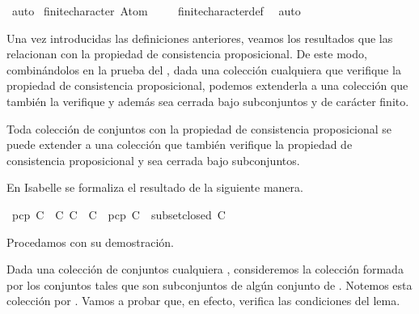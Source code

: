 \begin{isabellebody}
\ auto%
\endisatagproof
{\isafoldproof}%
%
\isadelimproof
\isanewline
%
\endisadelimproof
\isanewline
{}\isamarkupfalse%
\ {\isachardoublequoteopen}finite{\isacharunderscore}character\ {\isacharbraceleft}{\isacharbraceleft}Atom\ {}{\isacharbraceright}{\isacharcomma}{\isacharbraceleft}{\isacharbraceright}{\isacharbraceright}{\isachardoublequoteclose}\isanewline
%
\isadelimproof
\ \ %
\endisadelimproof
%
\isatagproof
{}\isamarkupfalse%
\ finite{\isacharunderscore}character{\isacharunderscore}def\ \isamarkupfalse%
\ auto%
\endisatagproof
{\isafoldproof}%
%
\isadelimproof
%
\endisadelimproof
%
\begin{isamarkuptext}%
Una vez introducidas las definiciones anteriores, veamos los resultados que las relacionan
  con la propiedad de consistencia proposicional. De este modo, combinándolos en la prueba del 
  , dada una colección  cualquiera que verifique la propiedad 
  de consistencia proposicional, podemos extenderla a una colección  que también la verifique y 
  además sea cerrada bajo subconjuntos y de carácter finito.


  \begin{lema}
    Toda colección de conjuntos con la propiedad de consistencia proposicional se puede extender a
    una colección que también verifique la propiedad de consistencia proposicional y sea cerrada 
    bajo subconjuntos.
  \end{lema}

  En Isabelle se formaliza el resultado de la siguiente manera.%
\end{isamarkuptext}\isamarkuptrue%
\isamarkupfalse%
\ {\isachardoublequoteopen}pcp\ C\ {\isasymLongrightarrow}\ {\isasymexists}C{\isacharprime}{\isachardot}\ C\ {\isasymsubseteq}\ C{\isacharprime}\ {\isasymand}\ pcp\ C{\isacharprime}\ {\isasymand}\ subset{\isacharunderscore}closed\ C{\isacharprime}{\isachardoublequoteclose}\isanewline
%
\isadelimproof
\ \ %
\endisadelimproof
%
\isatagproof
{}\isamarkupfalse%
%
\endisatagproof
{\isafoldproof}%
%
\isadelimproof
%
\endisadelimproof
%
\begin{isamarkuptext}%
Procedamos con su demostración.

\begin{demostracion}
  Dada una colección de conjuntos cualquiera , consideremos la colección formada por los 
  conjuntos tales que son subconjuntos de algún conjunto de . Notemos esta colección por 
  . Vamos a probar que, en efecto,  verifica  las condiciones del lema.


\end{demostracion}
\end{isamarkuptext}
\end{isabellebody}

